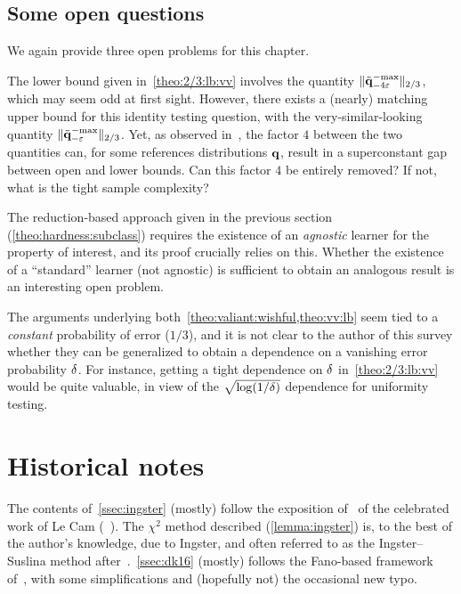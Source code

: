 \subsection{Some open questions}
We again provide three open problems for this chapter.

\begin{openproblem}
	The lower bound given in~\cref{theo:2/3:lb:vv} involves the quantity $\lVert\tilde{\mathbf{q}}^{-\!\max}_{-4\varepsilon}\rVert_{2/3}$, which may seem odd at first sight. However, there exists a (nearly) matching upper bound for this identity testing question, with the very-similar-looking quantity $\lVert\tilde{\mathbf{q}}^{-\!\max}_{-\varepsilon}\rVert_{2/3}$. Yet, as observed in~\citet{BlaisCG19}, the factor $4$ between the two quantities can, for some references distributions $\mathbf{q}$, result in a superconstant gap between open and lower bounds. Can this factor $4$ be entirely removed? If not, what is the tight sample complexity?
\end{openproblem}

\begin{openproblem}
The reduction-based approach given in the previous section (\cref{theo:hardness:subclass}) requires the existence of an \emph{agnostic} learner for the property of interest, and its proof crucially relies on this. Whether the existence of a ``standard'' learner (not agnostic) is sufficient to obtain an analogous result is an interesting open problem.
\end{openproblem}

\begin{openproblem}
The arguments underlying both~\cref{theo:valiant:wishful,theo:vv:lb} seem tied to a \emph{constant} probability of error (\eg $1/3$), and it is not clear to the author of this survey whether they can be generalized to obtain a dependence on a vanishing error probability $\delta$. For instance, getting a tight dependence on $\delta$ in~\cref{theo:2/3:lb:vv} would be quite valuable, in view of the $\sqrt{\log(1/\delta)}$ dependence for uniformity testing.
\end{openproblem}

\section{Historical notes}

The contents of~\cref{ssec:ingster} (mostly) follow the exposition of~\citet{Pollard:2003} of the celebrated work of Le Cam (\eg~\citet{LeCam73}). The $\chi^2$ method described (\cref{lemma:ingster}) is, to the best of the author's knowledge, due to Ingster, and often referred to as the Ingster--Suslina method after~\citep{IngsterS03}.~\cref{ssec:dk16} (mostly) follows the Fano-based framework of~\citet{DiakonikolasK16}, with some simplifications and (hopefully not) the occasional new typo.

